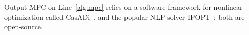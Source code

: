 \documentclass[letterpaper,10pt,journal,twoside]{IEEEtran}
\newcommand{\stt}[1]{{\small\tt #1}} %
\newcommand{\powprof}{\stt{powprofiler}}
\theoremstyle{definition}
\begin{document}
Output MPC on Line~\ref{alg:mpc} relies on a software framework for nonlinear optimization called CasADi~\cite{andersson2012casadi%
}, and the popular NLP solver IPOPT~\cite{wachter2006implementation}; both are open-source.





\end{document}
